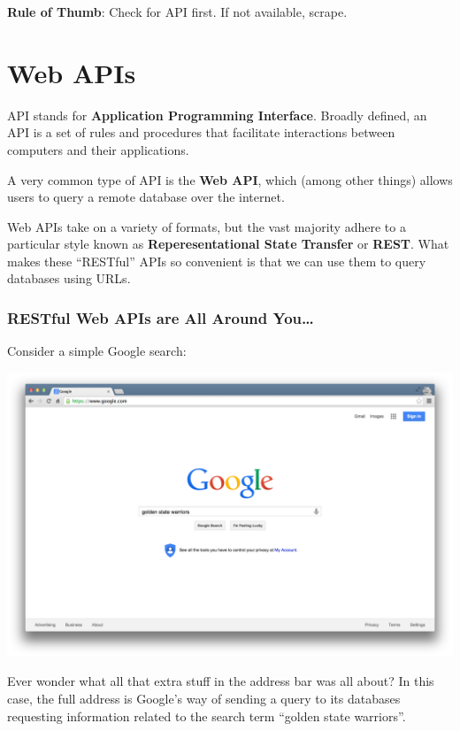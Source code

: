 \documentclass[]{book}
\begin{document}
\textbf{Rule of Thumb}: Check for API first. If not available, scrape.

\hypertarget{web-apis}{\section{Web APIs}\label{web-apis}}

API stands for \textbf{Application Programming Interface}. Broadly
defined, an API is a set of rules and procedures that facilitate
interactions between computers and their applications.

A very common type of API is the \textbf{Web API}, which (among other
things) allows users to query a remote database over the internet.

Web APIs take on a variety of formats, but the vast majority adhere to a
particular style known as \textbf{Reperesentational State Transfer} or
\textbf{REST}. What makes these ``RESTful'' APIs so convenient is that
we can use them to query databases using URLs.

\subsubsection*{RESTful Web APIs are All Around
You\ldots{}}\label{restful-web-apis-are-all-around-you}

Consider a simple Google search:

\begin{center}\includegraphics[width=0.7\linewidth]{img/google_search} \end{center}

Ever wonder what all that extra stuff in the address bar was all about?
In this case, the full address is Google's way of sending a query to its
databases requesting information related to the search term ``golden
state warriors''.
\end{document}
